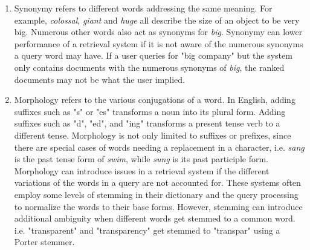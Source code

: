 \documentclass[11pt]{article}
\begin{document}
\begin{enumerate}
\begin{enumerate}
          \item Synonymy refers to different words addressing the same meaning. For example, \textit{colossal}, \textit{giant} and \textit{huge} all describe the size of an object to be very big. Numerous other words also act as synonyms for \textit{big}.
                Synonymy can lower performance of a retrieval system if it is not aware of the numerous synonyms a query word may have. If a user queries for "big company" but the system only contains documents with the numerous synonyms of \textit{big}, the ranked documents may not be what the user implied.

          \item Morphology refers to the various conjugations of a word. In English, adding suffixes such as "s" or "es" transforms a noun into its plural form. Adding suffixes such as "d", "ed", and "ing" transforms a present tense verb to a different tense. Morphology is not only limited to suffixes or prefixes, since there are special cases of words needing a replacement in a character, i.e. \textit{sang} is the past tense form of \textit{swim}, while \textit{sung} is its past participle form.
                Morphology can introduce issues in a retrieval system if the different variations of the words in a query are not accounted for. These systems often employ some levels of stemming in their dictionary and the query processing to normalize the words to their base forms. However, stemming can introduce additional ambiguity when different words get stemmed to a common word. i.e. "transparent" and "transparency" get stemmed to "transpar" using a Porter stemmer.
        \end{enumerate}

\end{enumerate}
\end{document}
